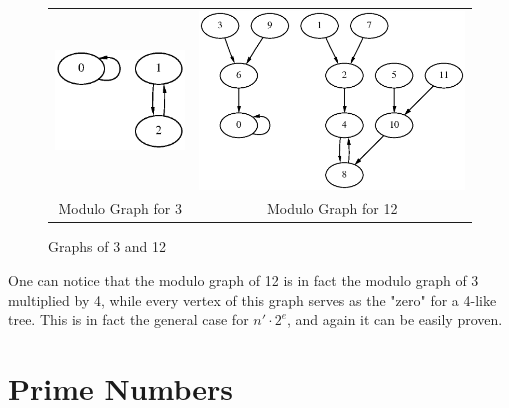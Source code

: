 \documentclass[a4paper]{report}
\begin{document}
\begin{figure}[ht]
\begin{tabular}{c||c}
\includegraphics[scale=0.75]{graph-3.eps} &
\includegraphics[scale=0.75]{graph-12.eps} \\
Modulo Graph for 3 &
Modulo Graph for 12
\end{tabular}
\caption{Graphs of 3 and 12}
\label{fig:graphs-of-3-and-12}
\end{figure}

One can notice that the modulo graph of 12 is in fact the modulo graph 
of 3 multiplied by 4, while every vertex of this graph serves as the "zero" 
for a 4-like tree. This is in fact the general case for $ n' \cdot 2^{e} $,
and again it can be easily proven.

\section{Prime Numbers}
\end{document}
